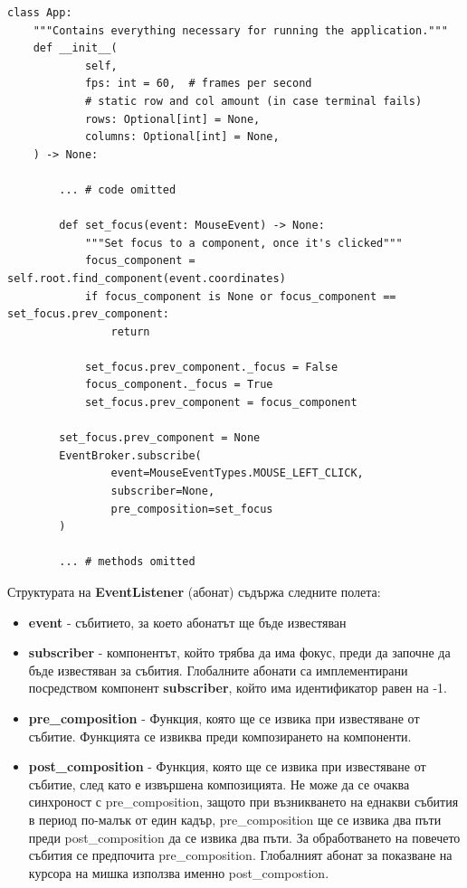         \vspace{5mm}
        \begin{lstlisting}[style=py]
class App:
    """Contains everything necessary for running the application."""
    def __init__(
            self,
            fps: int = 60,  # frames per second
            # static row and col amount (in case terminal fails)
            rows: Optional[int] = None,
            columns: Optional[int] = None,
    ) -> None:

        ... # code omitted

        def set_focus(event: MouseEvent) -> None:
            """Set focus to a component, once it's clicked"""
            focus_component = self.root.find_component(event.coordinates)
            if focus_component is None or focus_component == set_focus.prev_component:
                return

            set_focus.prev_component._focus = False
            focus_component._focus = True
            set_focus.prev_component = focus_component

        set_focus.prev_component = None
        EventBroker.subscribe(
                event=MouseEventTypes.MOUSE_LEFT_CLICK,
                subscriber=None,
                pre_composition=set_focus
        )

        ... # methods omitted

        \end{lstlisting}

        Структурата на \textbf{EventListener} (абонат) съдържа следните полета:

        \begin{itemize}
                \item \textbf{event} - събитието, за което абонатът ще бъде 
                        известяван
                \item \textbf{subscriber} - компонентът, който трябва да има 
                        фокус, преди да започне да бъде известяван за събития.
                        Глобалните абонати са имплементирани посредством
                        компонент \textbf{subscriber}, който има идентификатор
                        равен на -1.
                \item \textbf{pre\_composition} - Функция, която ще се извика 
                        при известяване от събитие. Функцията се извиква преди
                        композирането на компоненти.
                \item \textbf{post\_composition} - Функция, която ще се извика
                        при известяване от събитие, след като е извършена 
                        композицията. Не може да се очаква синхроност с
                        pre\_composition, защото при възникването на
                        еднакви събития в период по-малък от един кадър, 
                        pre\_composition ще се извика два пъти преди
                        post\_composition да се извика два пъти. За
                        обработването на повечето събития се предпочита 
                        pre\_composition. Глобалният абонат за показване на 
                        курсора на мишка използва именно post\_compostion.
        \end{itemize}

